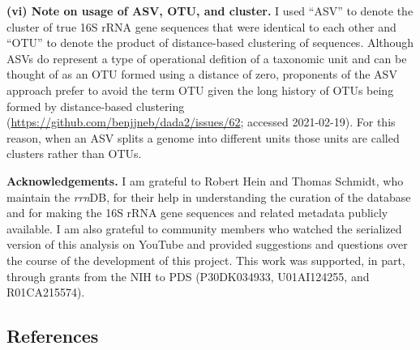 \documentclass[
]{article}
\begin{document}
\textbf{(vi) Note on usage of ASV, OTU, and cluster.} I used ``ASV'' to
denote the cluster of true 16S rRNA gene sequences that were identical
to each other and ``OTU'' to denote the product of distance-based
clustering of sequences. Although ASVs do represent a type of
operational defition of a taxonomic unit and can be thought of as an OTU
formed using a distance of zero, proponents of the ASV approach prefer
to avoid the term OTU given the long history of OTUs being formed by
distance-based clustering
(\url{https://github.com/benjjneb/dada2/issues/62}; accessed
2021-02-19). For this reason, when an ASV splits a genome into different
units those units are called clusters rather than OTUs.

\vspace{20mm}

\textbf{Acknowledgements.} I am grateful to Robert Hein and Thomas
Schmidt, who maintain the \emph{rrn}DB, for their help in understanding
the curation of the database and for making the 16S rRNA gene sequences
and related metadata publicly available. I am also grateful to community
members who watched the serialized version of this analysis on YouTube
and provided suggestions and questions over the course of the
development of this project. This work was supported, in part, through
grants from the NIH to PDS (P30DK034933, U01AI124255, and R01CA215574).

\newpage

\hypertarget{references}{%
\subsection{References}\label{references}}

\setlength{\parindent}{-0.25in}
\setlength{\leftskip}{0.25in}

\noindent
\end{document}
